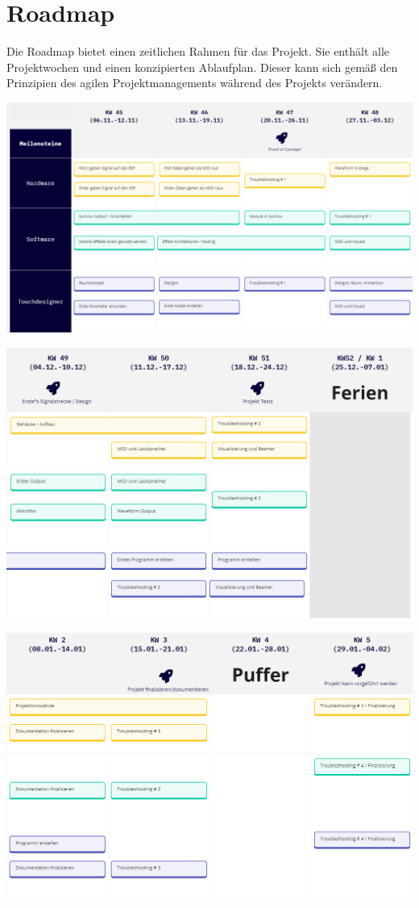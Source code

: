 \documentclass[12pt]{scrartcl}%
\theoremstyle{nonumberplain}
\begin{document}
\section{Roadmap}
Die Roadmap bietet einen zeitlichen Rahmen für das Projekt. Sie enthält alle Projektwochen und einen konzipierten Ablaufplan. Dieser kann sich gemäß den Prinzipien des agilen Projektmanagements während des Projekts verändern.
\begin{flushleft}
 \includegraphics[scale=0.4]{road1.png}
\end{flushleft}
\begin{flushleft}
 \includegraphics[scale=0.4]{road2.png}
\end{flushleft}
\begin{flushleft}
 \includegraphics[scale=0.4]{road3.png}
\end{flushleft}
\end{document}
